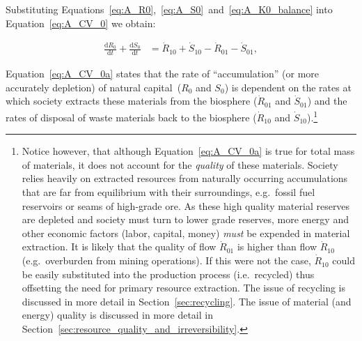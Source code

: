 Substituting Equations~\ref{eq:A_R0},~\ref{eq:A_S0}~and~\ref{eq:A_K0_balance}
into Equation~\ref{eq:A_CV_0} we obtain:

\begin{align}\label{eq:A_CV_0a}
	\frac{\mathrm{d}R_0}{\mathrm{d}t}		
	+	\frac{\mathrm{d}S_0}{\mathrm{d}t}		&	
	=	\dot{R}_{10}		
	+	\dot{S}_{10}	
	-	\dot{R}_{01}											
	-	\dot{S}_{01},							%
\end{align}






Equation~\ref{eq:A_CV_0a} states that the rate of ``accumulation'' 
(or more accurately depletion) of natural capital~($R_{0}$ and $S_{0}$) 
is dependent on the rates at which society extracts these materials
from the biosphere ($\dot{R}_{01}$ and $\dot{S}_{01}$) and the rates
of disposal of waste materials back to the biosphere ($\dot{R}_{10}$ 
and $\dot{S}_{10}$).\footnote{Notice however, 
that although Equation~\ref{eq:A_CV_0a} 
is true for total mass of materials,
it does not account for the \emph{quality} of these materials.
Society relies heavily on extracted resources 
from naturally occurring accumulations that are 
far from equilibrium with their surroundings,
e.g.\ fossil fuel reservoirs or seams of high-grade ore. 
As these high quality material reserves are depleted 
and society must turn to lower grade reserves, 
more energy and other economic factors (labor, capital, money) 
\emph{must} be expended  in material 
extraction.\cite{Mudd2010} 
It is likely that the quality
of flow $\dot{R}_{01}$ is higher than flow $\dot{R}_{10}$ 
(e.g.\ overburden from mining operations). 
If this were not the case,
$\dot{R}_{10}$ could be easily substituted 
into the production process (i.e.\ recycled) thus
offsetting the need for primary resource extraction. 
The issue of recycling is discussed in more detail in 
Section~\ref{sec:recycling}.
The issue of material (and energy) quality 
is discussed in more detail in 
Section~\ref{sec:resource_quality_and_irreversibility}. 
}


